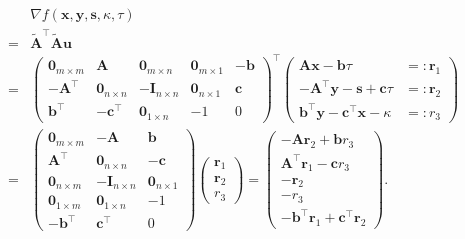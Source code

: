 \documentclass{article}
\newcommand{\backassign}{=:}
\newcommand{\x}{\mathbf{x}}
\newcommand{\A}{\mathbf{A}}
\newcommand{\0}{\textbf{0}}
\newcommand{\I}{\mathbf{I}}
\newcommand{\tmb}{\mathbf{b}}
\newcommand{\tmc}{\mathbf{c}}
\newcommand{\y}{\mathbf{y}}
\newcommand{\s}{\mathbf{s}}
\newcommand{\tmu}{\mathbf{u}}
\newcommand{\tmr}{\mathbf{r}}
\begin{document}
\begin{eqnarray*}
  &  & \nabla f \left( \x, \y, \s, \kappa, \tau \right)\\
  & = & \widetilde{\A}^{\top} \widetilde{\A} \tmu\\
  & = & \left(\begin{array}{ccccc}
    \0_{m \times m} & \A & \0_{m \times n} & \0_{m \times 1} & - \tmb\\
    - \A^{\top} & \0_{n \times n} & - \I_{n \times n} & \0_{n \times 1} &
    \tmc\\
    \tmb^{\top} & - \tmc^{\top} & \0_{1 \times n} & - 1 & 0
  \end{array}\right)^{\top} \left(\begin{array}{cc}
    \A \x - \tmb \tau & \backassign \tmr_1\\
    - \A^{\top} \y - \s + \tmc \tau & \backassign \tmr_2\\
    \tmb^{\top} \y - \tmc^{\top} \x - \kappa & \backassign r_3
  \end{array}\right)\\
  & = & \left(\begin{array}{ccc}
    \0_{m \times m} & - \A & \tmb\\
    \A^{\top} & \0_{n \times n} & - \tmc\\
    \0_{n \times m} & - \I_{n \times n} & \0_{n \times 1}\\
    \0_{1 \times m} & \0_{1 \times n} & - 1\\
    - \tmb^{\top} & \tmc^{\top} & 0
  \end{array}\right) \left(\begin{array}{c}
    \tmr_1\\
    \tmr_2\\
    r_3
  \end{array}\right) = \left(\begin{array}{c}
    - \A \tmr_2 + \tmb r_3\\
    \A^{\top} \tmr_1 - \tmc r_3\\
    - \tmr_2\\
    - r_3\\
    - \tmb^{\top} \tmr_1 + \tmc^{\top} \tmr_2
  \end{array}\right) .
\end{eqnarray*}
\end{document}
